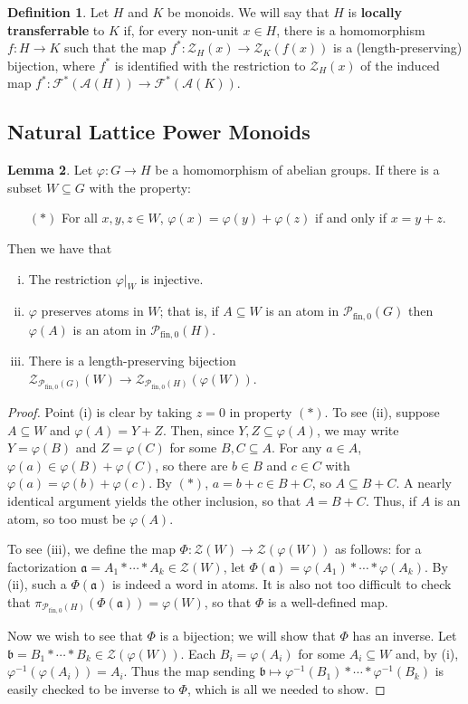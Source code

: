 \documentclass{report}
\newcommand{\A}{\mathscr{A}}
\renewcommand{\aa}{\mathfrak{a}}
\newcommand{\bb}{\mathfrak{b}}
\newcommand{\F}{\mathscr{F}}
\renewcommand{\P}{\mathcal{P}}
\newcommand{\Z}{\mathcal{Z}}
\newcommand{\fon}{{\textrm{fin}, 0}}
\renewcommand{\:}{\text{:}}
\theoremstyle{definition}
\newtheorem{defn}{Definition}[section]
\newtheorem{lemma}[defn]{Lemma}
\begin{document}
\begin{defn}
Let $H$ and $K$ be monoids. 
We will say that $H$ is \textbf{locally transferrable} to $K$ if, for every non-unit $x\in H$, there is a homomorphism $f: H \to K$ such that the map $f^*:\Z_H(x) \to \Z_K(f(x))$ is a (length-preserving) bijection, where $f^*$ is identified with the restriction to $\Z_H(x)$ of the induced map $f^*: \F^*(\A(H)) \to \F^*(\A(K))$.
\end{defn}

\subsection*{Natural Lattice Power Monoids}

\begin{lemma}\label{lem:local-transport}
Let $\varphi: G \to H$ be a homomorphism of abelian groups. 
If there is a subset $W\subseteq G$ with the property:
\begin{itemize}
\item[$(*)$] For all $x,y,z\in W$, $\varphi(x) = \varphi(y) + \varphi(z)$ if and only if $x = y + z$.
\end{itemize}
Then we have that
\begin{enumerate}[(i)]
\item The restriction $\varphi|_W$ is injective.
\item $\varphi$ preserves atoms in $W$; that is, if $A\subseteq W$ is an atom in $\P_\fon(G)$ then $\varphi(A)$ is an atom in $\P_\fon(H)$.
\item There is a length-preserving bijection $\Z_{\P_\fon(G)}(W) \to \Z_{\P_\fon(H)}(\varphi(W))$.
\end{enumerate}
\end{lemma}

\begin{proof}
Point (i) is clear by taking $z = 0$ in property $(*)$.
To see (ii), suppose $A\subseteq W$ and $\varphi(A) = Y+Z$.
Then, since $Y,Z\subseteq \varphi(A)$, we may write $Y = \varphi(B)$ and $Z = \varphi(C)$ for some $B,C\subseteq A$.
For any $a\in A$, $\varphi(a) \in \varphi(B) + \varphi(C)$, so there are $b\in B$ and $c\in C$ with $\varphi(a) = \varphi(b) + \varphi(c)$.
By $(*)$, $a = b + c \in B+C$, so $A \subseteq B + C$.
A nearly identical argument yields the other inclusion, so that $A = B+C$.
Thus, if $A$ is an atom, so too must be $\varphi(A)$. 

To see (iii), we define the map $\Phi:\Z(W) \to \Z(\varphi(W))$ as follows: for a factorization $\aa = A_1*\cdots * A_k \in \Z(W)$, let $\Phi(\aa) = \varphi(A_1)*\cdots*\varphi(A_k)$. 
By (ii), such a $\Phi(\aa)$ is indeed a word in atoms.  
It is also not too difficult to check that $\pi_{\P_\fon(H)}(\Phi(\aa)) = \varphi(W)$, so that $\Phi$ is a well-defined map.  

Now we wish to see that $\Phi$ is a bijection; we will show that $\Phi$ has an inverse.
Let $\bb = B_1 * \cdots * B_k\in \Z(\varphi(W))$.
Each $B_i = \varphi(A_i)$ for some $A_i\subseteq W$ and, by (i), $\varphi^{-1}(\varphi(A_i)) = A_i$.
Thus the map sending $\bb \mapsto \varphi^{-1}(B_1) * \cdots * \varphi^{-1}(B_k)$ is easily checked to be inverse to $\Phi$, which is all we needed to show.
\end{proof}
\end{document}
